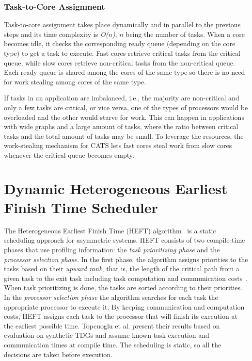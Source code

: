 \subsubsection{Task-to-Core Assignment}
\label{sec.cats.assignment}
Task-to-core assignment takes place dynamically and in parallel to the previous steps and its time complexity is \textit{O($n$)}, \textit{$n$} being the number of tasks. When a core becomes idle, it checks the corresponding ready queue (depending on the core type) to get a task to execute. Fast cores retrieve critical tasks from the critical queue, while slow cores retrieve non-critical tasks from the non-critical queue. Each ready queue is shared among the cores of the same type so there is no need for work stealing among cores of the same type. 

If tasks in an application are imbalanced, i.e., the majority are non-critical and only a few tasks are critical, or vice versa, one of the types of processors would be overloaded and the other would starve for work. This can happen in applications with wide graphs and a large amount of tasks, where the ratio between critical tasks and the total amount of tasks may be small. To leverage the resources, the work-stealing mechanism for CATS lets fast cores steal work from slow cores whenever the critical queue becomes empty. 




\section{Dynamic Heterogeneous Earliest Finish Time Scheduler}
\label{sec.scheduling.heft}
The Heterogeneous Earliest Finish Time (HEFT) algorithm~\cite{HEFT} is a static scheduling approach for asymmetric systems.
HEFT consists of two compile-time phases that use profiling information: the \textit{task prioritizing phase} and the \textit{processor selection phase}.
In the first phase, the algorithm assigns priorities to the tasks based on their \textit{upward rank}, that is, the length of the critical path from a given task to the exit task including task computation and communication costs~\cite{HEFT}.
When task prioritizing is done, the tasks are sorted according to their priorities.
In the \textit{processor selection phase} the algorithm searches for each task the appropriate processor to execute it.
By keeping communication and computation costs, HEFT assigns each task to the processor that will finish its execution at the earliest possible time.
Topcuoglu et al. \cite{HEFT} present their results based on evaluation on synthetic TDGs and assume known task execution and communication times at compile time.
The scheduling is static, so all the decisions are taken before execution.

